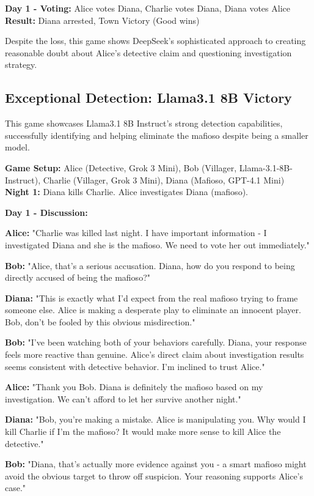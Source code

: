 \documentclass{article}
\begin{document}
\begin{resultbox}
\textbf{Day 1 - Voting:} Alice votes Diana, Charlie votes Diana, Diana votes Alice\\
\textbf{Result:} Diana arrested, Town Victory (Good wins)
\end{resultbox}

Despite the loss, this game shows DeepSeek's sophisticated approach to creating reasonable doubt about Alice's detective claim and questioning investigation strategy.

\subsection{Exceptional Detection: Llama3.1 8B Victory}

This game showcases Llama3.1 8B Instruct's strong detection capabilities, successfully identifying and helping eliminate the mafioso despite being a smaller model.

\begin{setupbox}
\textbf{Game Setup:} Alice (Detective, Grok 3 Mini), Bob (Villager, Llama-3.1-8B-Instruct), Charlie (Villager, Grok 3 Mini), Diana (Mafioso, GPT-4.1 Mini)\\
\textbf{Night 1:} Diana kills Charlie. Alice investigates Diana (mafioso).
\end{setupbox}

\begin{dialoguebox}
\textbf{Day 1 - Discussion:}

\medskip
\textbf{Alice:} "Charlie was killed last night. I have important information - I investigated Diana and she is the mafioso. We need to vote her out immediately."

\textbf{Bob:} "Alice, that's a serious accusation. Diana, how do you respond to being directly accused of being the mafioso?"

\textbf{Diana:} "This is exactly what I'd expect from the real mafioso trying to frame someone else. Alice is making a desperate play to eliminate an innocent player. Bob, don't be fooled by this obvious misdirection."

\textbf{Bob:} "I've been watching both of your behaviors carefully. Diana, your response feels more reactive than genuine. Alice's direct claim about investigation results seems consistent with detective behavior. I'm inclined to trust Alice."

\textbf{Alice:} "Thank you Bob. Diana is definitely the mafioso based on my investigation. We can't afford to let her survive another night."

\textbf{Diana:} "Bob, you're making a mistake. Alice is manipulating you. Why would I kill Charlie if I'm the mafioso? It would make more sense to kill Alice the detective."

\textbf{Bob:} "Diana, that's actually more evidence against you - a smart mafioso might avoid the obvious target to throw off suspicion. Your reasoning supports Alice's case."
\end{dialoguebox}
\end{document}
